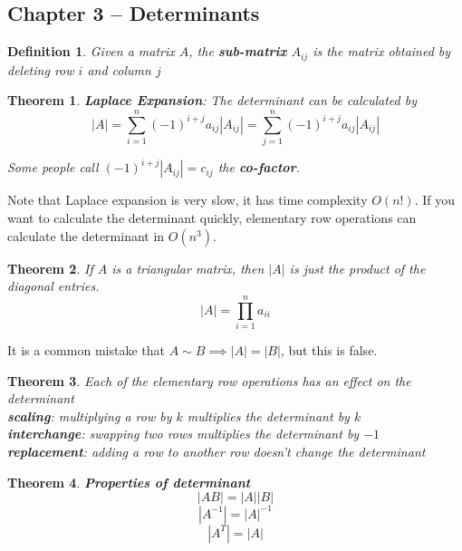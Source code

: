 \documentclass[11pt]{article}
\newtheorem{thm}{Theorem}
\newtheorem{defn}{Definition}
\begin{document}
\subsection{Chapter 3 -- Determinants}

\begin{defn}
  Given a matrix $A$, the \textbf{sub-matrix} $A_{ij}$ is the matrix obtained by deleting row $i$ and column $j$
\end{defn}

\begin{thm}
  \textbf{Laplace Expansion}: The determinant can be calculated by
  \[|A| = \sum_{i=1}^{n} (-1)^{i+j} a_{ij}|A_{ij}|= \sum_{j=1}^{n} (-1)^{i+j} a_{ij}|A_{ij}|\]

  Some people call $(-1)^{i+j}|A_{ij}| = c_{ij}$ the \textbf{co-factor}.
\end{thm}

Note that Laplace expansion is very slow, it has time complexity $O(n!)$. If you want to calculate the determinant quickly, elementary row operations can
calculate the determinant in $O(n^{3})$.

\begin{thm}
  If $A$ is a triangular matrix, then $|A|$ is just the product of the diagonal entries.
  \[|A| = \prod_{i=1}^{n}a_{ii}\]
\end{thm}

It is a common mistake that $A \sim B \implies |A| =  |B|$, but this is false.

\begin{thm}
  Each of the elementary row operations has an effect on the determinant\\
  \textbf{scaling}: multiplying a row by $k$ multiplies the determinant by $k$ \\
  \textbf{interchange}: swapping two rows multiplies the determinant by $-1$ \\
  \textbf{replacement}: adding a row to another row doesn't change the determinant \\
\end{thm}

\begin{thm}
  \textbf{Properties of determinant}
  \[|AB|=|A||B|\]
  \[|A^{-1}|=|A|^{-1}\]
  \[|A^{T}|=|A|\]
\end{thm}
\end{document}
